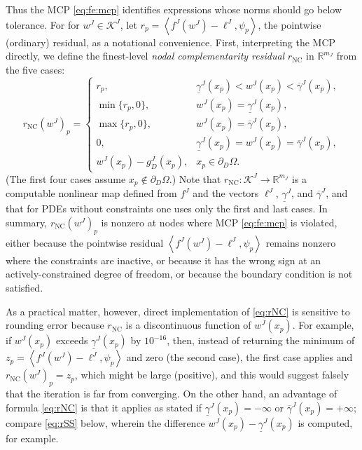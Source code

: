 \documentclass[letterpaper,final,12pt,reqno]{amsart}
\theoremstyle{cstyle}
\theoremstyle{cstyle*}
\theoremstyle{dstyle}
\numberwithin{equation}{section}
\numberwithin{figure}{section}
\numberwithin{table}{section}
\numberwithin{theorem}{section}
\newcommand{\RR}{\mathbb{R}}
\newcommand{\ip}[2]{\left<#1,#2\right>}
\newcommand{\rNC}{r_{\text{NC}}}
\begin{document}
Thus the MCP \eqref{eq:fe:mcp} identifies expressions whose norms should go below tolerance.  For for $w^J \in \mathcal{K}^J$, let $r_p = \ip{f^J(w^J)-\ell^J}{\psi_p}$, the pointwise (ordinary) residual, as a notational convenience.  First, interpreting the MCP directly, we define the finest-level \emph{nodal complementarity residual} $\rNC$ in $\RR^{m_J}$ from the five cases:
\begin{equation}
\rNC(w^J)_p = \begin{cases}
    r_p, & \underline{\gamma}^J(x_p) < w^J(x_p) < \overline{\gamma}^J(x_p), \\
    \min\{r_p,0\}, & w^J(x_p) = \underline{\gamma}^J(x_p), \\
    \max\{r_p,0\}, & w^J(x_p) = \overline{\gamma}^J(x_p), \\
    0, & \underline{\gamma}^J(x_p)=w^J(x_p)=\overline{\gamma}^J(x_p), \\
    w^J(x_p) - g_D^J(x_p), & x_p \in \partial_D\Omega. \end{cases} \label{eq:rNC}
\end{equation}
(The first four cases assume $x_p \notin \partial_D\Omega$.)  Note that $\rNC : \mathcal{K}^J \to \RR^{m_J}$ is a computable nonlinear map defined from $f^J$ and the vectors $\ell^J$, $\underline{\gamma}^J$, and $\overline{\gamma}^J$, and that for PDEs without constraints one uses only the first and last cases.  In summary, $\rNC(w^J)_p$ is nonzero at nodes where MCP \eqref{eq:fe:mcp} is violated, either because the pointwise residual $\ip{f^J(w^J)-\ell^J}{\psi_p}$ remains nonzero where the constraints are inactive, or because it has the wrong sign at an actively-constrained degree of freedom, or because the boundary condition is not satisfied.

As a practical matter, however, direct implementation of \eqref{eq:rNC} is sensitive to rounding error because $\rNC$ is a discontinuous function of $w^J(x_p)$.  For example, if $w^J(x_p)$ exceeds $\underline{\gamma}^J(x_p)$ by $10^{-16}$, then, instead of returning the minimum of $z_p = \left<f^J(w^J)-\ell^J,\psi_p\right>$ and zero (the second case), the first case applies and $\rNC(w^J)_p = z_p$, which might be large (positive), and this would suggest falsely that the iteration is far from converging.  On the other hand, an advantage of formula \eqref{eq:rNC} is that it applies as stated if $\underline{\gamma}^J(x_p)=-\infty$ or $\overline{\gamma}^J(x_p)=+\infty$; compare \eqref{eq:rSS} below, wherein the difference $w^J(x_p) - \underline{\gamma}^J(x_p)$ is computed, for example.
\end{document}
